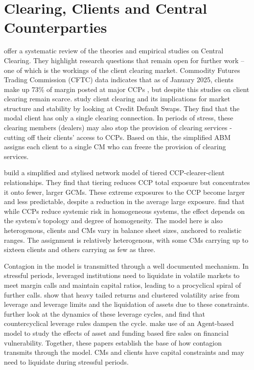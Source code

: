 
\section{Clearing, Clients and Central Counterparties}\label{sec:rw-clearing}

 \cite{menkveld_vuillemey_2021} offer a systematic review of the theories and empirical studies on Central Clearing. They highlight research questions that remain open for further work -- one of which is the workings of the client clearing market. Commodity Futures Trading Commission (CFTC) data indicates that as of January 2025, clients make up 73\% of margin posted at major CCPs \citep{fia_tracker}, but despite this studies on client clearing remain scarce. \cite{ofr_2026} study client clearing and its implications for market structure and stability by looking at Credit Default Swaps. They find that the modal client has only a single clearing connection. In periods of stress, these clearing members (dealers) may also stop the provision of clearing services - cutting off their clients' access to CCPs. Based on this, the simplified ABM assigns each client to a single CM who can freeze the provision of clearing services.

\cite{galbiati_soramaki_2013} build a simplified and stylised network model of tiered CCP-clearer-client relationships. They find that tiering reduces CCP total exposure but concentrates it onto fewer, larger GCMs. These extreme exposures to the CCP become larger and less predictable, despite a reduction in the average large exposure. 
 \cite{borovkova_2013} find that while CCPs reduce systemic risk in homogeneous systems, the effect depends on the system's topology and degree of homogeneity. The model here is also heterogenous, clients and CMs vary in balance sheet sizes, anchored to realistic ranges. The assignment is relatively heterogenous, with some CMs carrying up to sixteen clients and others carrying as few as three.


Contagion in the model is transmitted through a well documented mechanism. In stressful periods, leveraged institutions need to liquidate in volatile markets to meet margin calls and maintain capital ratios, leading to a procyclical spiral of further calls. \cite{thurner_2012} show that heavy tailed returns and clustered volatility arise from leverage and leverage limits and the liquidation of assets due to these constraints. \cite{aymanns_farmer_2015} further look at the dynamics of these leverage cycles, and find that countercyclical leverage rules dampen the cycle. \cite{bookstaber_2014} make use of an Agent-based model to study the effects of asset and funding based fire sales on financial vulnerability. Together, these papers establish the base of how contagion transmits through the model. CMs and clients have capital constraints and may need to liquidate during stressful periods. 

